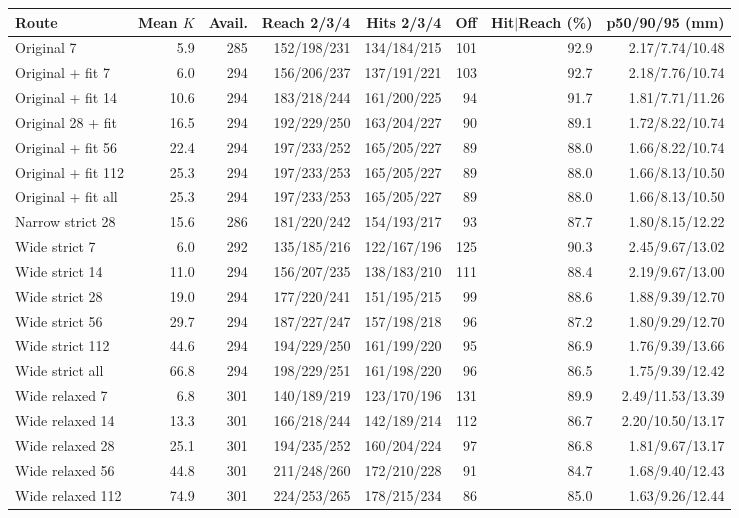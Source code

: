 \begin{tabular}{lrrrrrrr}
\toprule
Route & Mean $K$ & Avail. & Reach 2/3/4 & Hits 2/3/4 & Off & Hit$\mid$Reach (\%) & p50/90/95 (mm) \\
\midrule
Original 7 & 5.9 & 285 & 152/198/231 & 134/184/215 & 101 & 92.9 & 2.17/7.74/10.48 \\
Original + fit 7 & 6.0 & 294 & 156/206/237 & 137/191/221 & 103 & 92.7 & 2.18/7.76/10.74 \\
Original + fit 14 & 10.6 & 294 & 183/218/244 & 161/200/225 & 94 & 91.7 & 1.81/7.71/11.26 \\
Original 28 + fit & 16.5 & 294 & 192/229/250 & 163/204/227 & 90 & 89.1 & 1.72/8.22/10.74 \\
Original + fit 56 & 22.4 & 294 & 197/233/252 & 165/205/227 & 89 & 88.0 & 1.66/8.22/10.74 \\
Original + fit 112 & 25.3 & 294 & 197/233/253 & 165/205/227 & 89 & 88.0 & 1.66/8.13/10.50 \\
Original + fit all & 25.3 & 294 & 197/233/253 & 165/205/227 & 89 & 88.0 & 1.66/8.13/10.50 \\
Narrow strict 28 & 15.6 & 286 & 181/220/242 & 154/193/217 & 93 & 87.7 & 1.80/8.15/12.22 \\
Wide strict 7 & 6.0 & 292 & 135/185/216 & 122/167/196 & 125 & 90.3 & 2.45/9.67/13.02 \\
Wide strict 14 & 11.0 & 294 & 156/207/235 & 138/183/210 & 111 & 88.4 & 2.19/9.67/13.00 \\
Wide strict 28 & 19.0 & 294 & 177/220/241 & 151/195/215 & 99 & 88.6 & 1.88/9.39/12.70 \\
Wide strict 56 & 29.7 & 294 & 187/227/247 & 157/198/218 & 96 & 87.2 & 1.80/9.29/12.70 \\
Wide strict 112 & 44.6 & 294 & 194/229/250 & 161/199/220 & 95 & 86.9 & 1.76/9.39/13.66 \\
Wide strict all & 66.8 & 294 & 198/229/251 & 161/198/220 & 96 & 86.5 & 1.75/9.39/12.42 \\
Wide relaxed 7 & 6.8 & 301 & 140/189/219 & 123/170/196 & 131 & 89.9 & 2.49/11.53/13.39 \\
Wide relaxed 14 & 13.3 & 301 & 166/218/244 & 142/189/214 & 112 & 86.7 & 2.20/10.50/13.17 \\
Wide relaxed 28 & 25.1 & 301 & 194/235/252 & 160/204/224 & 97 & 86.8 & 1.81/9.67/13.17 \\
Wide relaxed 56 & 44.8 & 301 & 211/248/260 & 172/210/228 & 91 & 84.7 & 1.68/9.40/12.43 \\
Wide relaxed 112 & 74.9 & 301 & 224/253/265 & 178/215/234 & 86 & 85.0 & 1.63/9.26/12.44 \\

\end{tabular}
